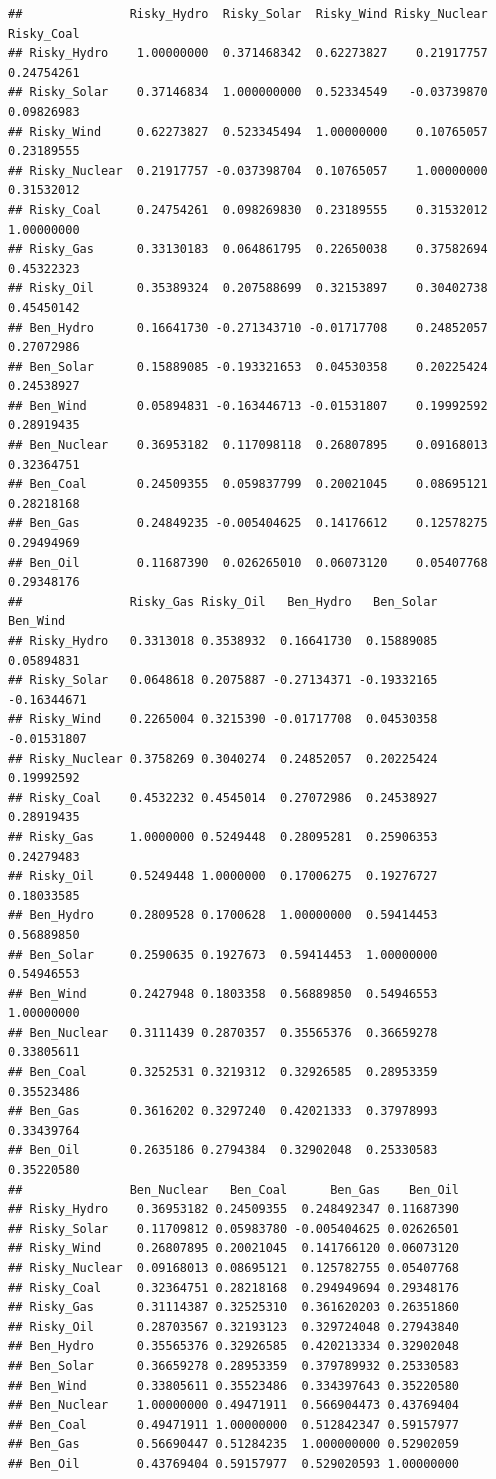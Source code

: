 \documentclass[
]{article}
\begin{document}
\begin{verbatim}
##               Risky_Hydro  Risky_Solar  Risky_Wind Risky_Nuclear Risky_Coal
## Risky_Hydro    1.00000000  0.371468342  0.62273827    0.21917757 0.24754261
## Risky_Solar    0.37146834  1.000000000  0.52334549   -0.03739870 0.09826983
## Risky_Wind     0.62273827  0.523345494  1.00000000    0.10765057 0.23189555
## Risky_Nuclear  0.21917757 -0.037398704  0.10765057    1.00000000 0.31532012
## Risky_Coal     0.24754261  0.098269830  0.23189555    0.31532012 1.00000000
## Risky_Gas      0.33130183  0.064861795  0.22650038    0.37582694 0.45322323
## Risky_Oil      0.35389324  0.207588699  0.32153897    0.30402738 0.45450142
## Ben_Hydro      0.16641730 -0.271343710 -0.01717708    0.24852057 0.27072986
## Ben_Solar      0.15889085 -0.193321653  0.04530358    0.20225424 0.24538927
## Ben_Wind       0.05894831 -0.163446713 -0.01531807    0.19992592 0.28919435
## Ben_Nuclear    0.36953182  0.117098118  0.26807895    0.09168013 0.32364751
## Ben_Coal       0.24509355  0.059837799  0.20021045    0.08695121 0.28218168
## Ben_Gas        0.24849235 -0.005404625  0.14176612    0.12578275 0.29494969
## Ben_Oil        0.11687390  0.026265010  0.06073120    0.05407768 0.29348176
##               Risky_Gas Risky_Oil   Ben_Hydro   Ben_Solar    Ben_Wind
## Risky_Hydro   0.3313018 0.3538932  0.16641730  0.15889085  0.05894831
## Risky_Solar   0.0648618 0.2075887 -0.27134371 -0.19332165 -0.16344671
## Risky_Wind    0.2265004 0.3215390 -0.01717708  0.04530358 -0.01531807
## Risky_Nuclear 0.3758269 0.3040274  0.24852057  0.20225424  0.19992592
## Risky_Coal    0.4532232 0.4545014  0.27072986  0.24538927  0.28919435
## Risky_Gas     1.0000000 0.5249448  0.28095281  0.25906353  0.24279483
## Risky_Oil     0.5249448 1.0000000  0.17006275  0.19276727  0.18033585
## Ben_Hydro     0.2809528 0.1700628  1.00000000  0.59414453  0.56889850
## Ben_Solar     0.2590635 0.1927673  0.59414453  1.00000000  0.54946553
## Ben_Wind      0.2427948 0.1803358  0.56889850  0.54946553  1.00000000
## Ben_Nuclear   0.3111439 0.2870357  0.35565376  0.36659278  0.33805611
## Ben_Coal      0.3252531 0.3219312  0.32926585  0.28953359  0.35523486
## Ben_Gas       0.3616202 0.3297240  0.42021333  0.37978993  0.33439764
## Ben_Oil       0.2635186 0.2794384  0.32902048  0.25330583  0.35220580
##               Ben_Nuclear   Ben_Coal      Ben_Gas    Ben_Oil
## Risky_Hydro    0.36953182 0.24509355  0.248492347 0.11687390
## Risky_Solar    0.11709812 0.05983780 -0.005404625 0.02626501
## Risky_Wind     0.26807895 0.20021045  0.141766120 0.06073120
## Risky_Nuclear  0.09168013 0.08695121  0.125782755 0.05407768
## Risky_Coal     0.32364751 0.28218168  0.294949694 0.29348176
## Risky_Gas      0.31114387 0.32525310  0.361620203 0.26351860
## Risky_Oil      0.28703567 0.32193123  0.329724048 0.27943840
## Ben_Hydro      0.35565376 0.32926585  0.420213334 0.32902048
## Ben_Solar      0.36659278 0.28953359  0.379789932 0.25330583
## Ben_Wind       0.33805611 0.35523486  0.334397643 0.35220580
## Ben_Nuclear    1.00000000 0.49471911  0.566904473 0.43769404
## Ben_Coal       0.49471911 1.00000000  0.512842347 0.59157977
## Ben_Gas        0.56690447 0.51284235  1.000000000 0.52902059
## Ben_Oil        0.43769404 0.59157977  0.529020593 1.00000000
\end{verbatim}
\end{document}

